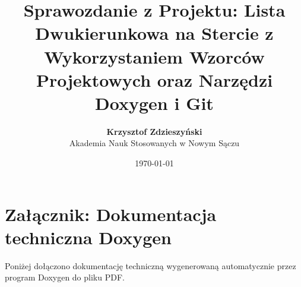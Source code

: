 \documentclass[12pt,a4paper]{article}
\title{\textbf{Sprawozdanie z Projektu: Lista Dwukierunkowa na Stercie z Wykorzystaniem Wzorców Projektowych oraz Narzędzi Doxygen i Git}}
\author{\textbf{Krzysztof Zdzieszyński} \\ Akademia Nauk Stosowanych w Nowym Sączu}
\date{\today}
\begin{document}
\maketitle
\tableofcontents
\newpage


\newpage


\newpage


\newpage


\newpage



\newpage
\appendix
\section{Załącznik: Dokumentacja techniczna Doxygen}
Poniżej dołączono dokumentację techniczną wygenerowaną automatycznie przez program Doxygen do pliku PDF.


\end{document}
